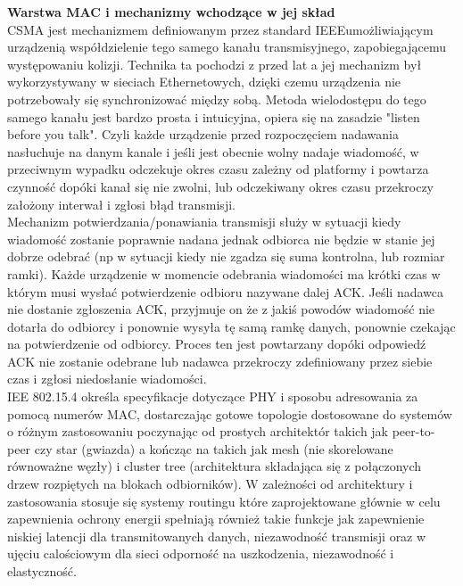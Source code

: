 \par \tab \textbf{ Warstwa MAC i mechanizmy wchodzące w jej skład} \\ 
\tab 	CSMA jest mechanizmem definiowanym przez standard IEEEumożliwiającym urządzenią współdzielenie tego samego kanału transmisyjnego, zapobiegającemu występowaniu kolizji. Technika ta pochodzi z przed lat a jej mechanizm był wykorzystywany w sieciach Ethernetowych, dzięki czemu urządzenia nie potrzebowały się synchronizować między sobą. Metoda wielodostępu do tego samego kanału jest bardzo prosta i intuicyjna, opiera się na zasadzie "listen before you talk". Czyli każde urządzenie przed rozpoczęciem nadawania nasłuchuje na danym kanale i jeśli jest obecnie wolny nadaje wiadomość, w przeciwnym wypadku odczekuje okres czasu zależny od platformy i powtarza czynność dopóki kanał się nie zwolni, lub odczekiwany okres czasu przekroczy założony interwał i zgłosi błąd transmisji.\\
\tab 	Mechanizm potwierdzania/ponawiania transmisji służy w sytuacji kiedy wiadomość zostanie poprawnie nadana jednak odbiorca nie będzie w stanie jej dobrze odebrać (np w sytuacji kiedy nie zgadza się suma kontrolna, lub rozmiar ramki). Każde urządzenie w momencie odebrania wiadomości ma krótki czas w którym musi wysłać potwierdzenie odbioru nazywane dalej ACK. Jeśli nadawca nie dostanie zgłoszenia ACK, przyjmuje on że z jakiś powodów wiadomość nie dotarła do odbiorcy i ponownie wysyła tę samą ramkę danych, ponownie czekając na potwierdzenie od odbiorcy. Proces ten jest powtarzany dopóki odpowiedź ACK nie zostanie odebrane lub nadawca przekroczy zdefiniowany przez siebie czas i zgłosi niedosłanie wiadomości.\\	
\tab 	IEE 802.15.4 określa specyfikacje dotyczące PHY i sposobu adresowania za pomocą numerów MAC, dostarczając gotowe topologie dostosowane do systemów o różnym zastosowaniu poczynając od prostych architektór takich jak peer-to-peer czy star (gwiazda) a kończąc na takich jak mesh (nie skorelowane równoważne węzły) i cluster tree (architektura składająca się z połączonych drzew rozpiętych na blokach odbiorników). W zależności od architektury i zastosowania stosuje się systemy routingu które zaprojektowane głównie w celu zapewnienia ochrony energii spełniają również takie funkcje jak zapewnienie niskiej latencji dla transmitowanych danych, niezawodność transmisji oraz w ujęciu calościowym dla sieci odporność na uszkodzenia, niezawodność i elastyczność. \\

